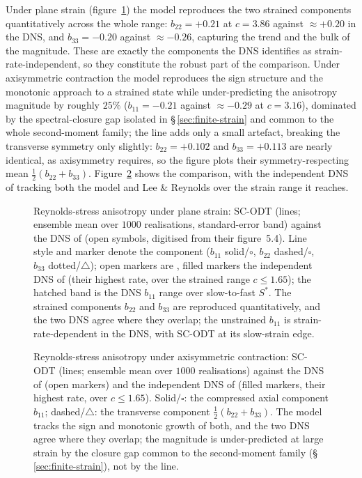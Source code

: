 \documentclass[11pt,a4paper]{article}
\begin{document}
Under plane strain (figure~\ref{fig:lr-plane-fig}) the model reproduces the
two strained components quantitatively across the whole range:
$b_{22}=+0.21$ at $c=3.86$ against $\approx+0.20$ in the DNS, and
$b_{33}=-0.20$ against $\approx-0.26$, capturing the trend and the bulk
of the magnitude. These are exactly the components the DNS identifies as
strain-rate-independent, so they constitute the robust part of the
comparison. Under axisymmetric contraction the model reproduces the
sign structure and the monotonic approach to a strained state while
under-predicting the anisotropy magnitude by roughly $25\%$
($b_{11}=-0.21$ against $\approx-0.29$ at $c=3.16$), dominated by the
spectral-closure gap isolated in \S\,\ref{sec:finite-strain} and common
to the whole second-moment family; the line adds only a small artefact,
breaking the transverse symmetry only slightly: $b_{22}=+0.102$ and
$b_{33}=+0.113$ are nearly identical, as axisymmetry requires, so the
figure plots their symmetry-respecting mean
$\tfrac12(b_{22}+b_{33})$. Figure~\ref{fig:lr-axisym-fig}
shows the comparison, with the independent DNS of \citet{ZusiPerot2014}
tracking both the model and Lee \& Reynolds over the strain range it
reaches.

\begin{figure}
  \centering
  \caption{Reynolds-stress anisotropy under plane strain: SC-ODT
  (lines; ensemble mean over $1000$ realisations, standard-error band)
  against the DNS of \citet{LeeReynolds1985} (open symbols, digitised
  from their figure~5.4). Line style and marker denote the component
  ($b_{11}$ solid/$\circ$, $b_{22}$ dashed/$\square$, $b_{33}$
  dotted/$\triangle$); open markers are \citet{LeeReynolds1985}, filled
  markers the independent DNS of \citet{ZusiPerot2013} (their highest
  rate, over the strained range $c\le1.65$); the hatched band is the DNS
  $b_{11}$ range over slow-to-fast $S^{*}$. The strained components
  $b_{22}$ and $b_{33}$ are reproduced quantitatively, and the two DNS
  agree where they overlap; the unstrained $b_{11}$ is
  strain-rate-dependent in the DNS, with SC-ODT at its
  slow-strain edge.}
  \label{fig:lr-plane-fig}
\end{figure}

\begin{figure}
  \centering
  \caption{Reynolds-stress anisotropy under axisymmetric contraction:
  SC-ODT (lines; ensemble mean over $1000$ realisations) against the DNS of \citet{LeeReynolds1985} (open markers) and the
  independent DNS of \citet{ZusiPerot2014} (filled markers, their highest
  rate, over $c\le1.65$). Solid/$\square$: the compressed axial component
  $b_{11}$; dashed/$\triangle$: the transverse component
  $\tfrac12(b_{22}+b_{33})$. The model tracks the sign and monotonic
  growth of both, and the two DNS agree where they overlap; the
  magnitude is under-predicted at large strain by the closure gap common
  to the second-moment family (\S\,\ref{sec:finite-strain}), not by the
  line.}
  \label{fig:lr-axisym-fig}
\end{figure}
\end{document}
